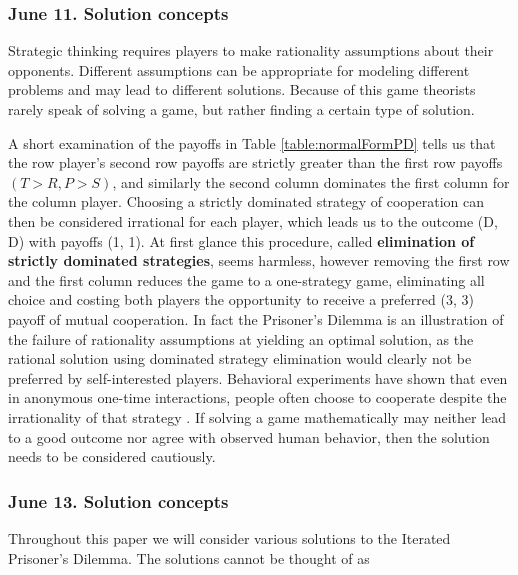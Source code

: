 \subsubsection{June 11. Solution concepts}

Strategic thinking requires players to make rationality assumptions about their opponents. Different assumptions can be appropriate for modeling different problems and may lead to different solutions. Because of this game theorists rarely speak of solving a game, but rather finding a certain type of solution.

A short examination of the payoffs in Table \ref{table:normalFormPD} tells us that the row player's second row payoffs are strictly greater than the first row payoffs $(T > R, P > S)$, and similarly the second column dominates the first column for the column player. Choosing a strictly dominated strategy of cooperation can then be considered irrational for each player, which leads us to the outcome (D, D) with payoffs (1, 1). At first glance this procedure, called \textbf{elimination of strictly dominated strategies}, seems harmless, however removing the first row and the first column reduces the game to a one-strategy game, eliminating all choice and costing both players the opportunity to receive a preferred (3, 3) payoff of mutual cooperation. In fact the Prisoner's Dilemma is an illustration of the failure of rationality assumptions at yielding an optimal solution, as the rational solution using dominated strategy elimination would clearly not be preferred by self-interested players. Behavioral experiments have shown that even in anonymous one-time interactions, people often choose to cooperate despite the irrationality of that strategy \cite{Khadjavi2013163}. If solving a game mathematically may neither lead to a good outcome nor agree with observed human behavior, then the solution needs to be considered cautiously.

\subsubsection{June 13. Solution concepts}
Throughout this paper we will consider various solutions to the Iterated Prisoner's Dilemma. The solutions cannot be thought of as



